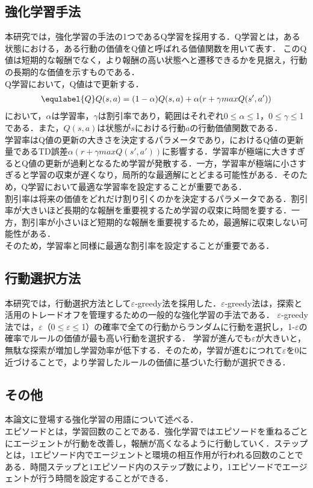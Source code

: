 \subsection{強化学習手法}
本研究では，強化学習の手法の1つであるQ学習を採用する．Q学習とは，ある状態における，ある行動の価値をQ値と呼ばれる価値関数を用いて表す．
このQ値は短期的な報酬でなく，より報酬の高い状態へと遷移できるかを見据え，行動の長期的な価値を示すものである．\\
Q学習において，Q値はで更新する．\\
\begin{eqnarray}
  \equlabel{Q}
  Q(s,a)=(1-\alpha)Q(s,a)+\alpha(r+\gamma maxQ(s',a'))
\end{eqnarray}
において，$\alpha$は学習率，$\gamma$は割引率であり，範囲はそれぞれ0$\leq$$\alpha$$\leq$1，0$\leq$$\gamma$$\leq$1である．また，$Q(s,a)$は状態が$s$における行動$a$の行動価値関数である．\\
学習率はQ値の更新の大きさを決定するパラメータであり，におけるQ値の更新量であるTD誤差$\alpha(r+\gamma maxQ(s',a'))$に影響する．学習率が極端に大きすぎるとQ値の更新が過剰となるため学習が発散する．一方，学習率が極端に小さすぎると学習の収束が遅くなり，局所的な最適解にとどまる可能性がある．そのため，Q学習において最適な学習率を設定することが重要である．\\
割引率は将来の価値をどれだけ割り引くのかを決定するパラメータである．割引率が大きいほど長期的な報酬を重要視するため学習の収束に時間を要する．一方，割引率が小さいほど短期的な報酬を重要視するため，最適解に収束しない可能性がある．\\
そのため，学習率と同様に最適な割引率を設定することが重要である．
\subsection{行動選択方法}
本研究では，行動選択方法として$\varepsilon$-greedy法を採用した．$\varepsilon$-greedy法は，探索と活用のトレードオフを管理するための一般的な強化学習の手法である．
$\varepsilon$-greedy法では，$\varepsilon$（0$\leq$$\varepsilon$$\leq$1）の確率で全ての行動からランダムに行動を選択し，1-$\varepsilon$の確率でルールの価値が最も高い行動を選択する．
学習が進んでも$\varepsilon$が大きいと，無駄な探索が増加し学習効率が低下する．そのため，学習が進むにつれて$\varepsilon$を0に近づけることで，より学習したルールの価値に基づいた行動が選択できる．
\subsection{その他}
本論文に登場する強化学習の用語について述べる．\\
エピソードとは，学習回数のことである．強化学習ではエピソードを重ねるごとにエージェントが行動を改善し，報酬が高くなるように行動していく．ステップとは，1エピソード内でエージェントと環境の相互作用が行われる回数のことである．時間ステップと1エピソード内のステップ数により，1エピソードでエージェントが行う時間を設定することができる．
